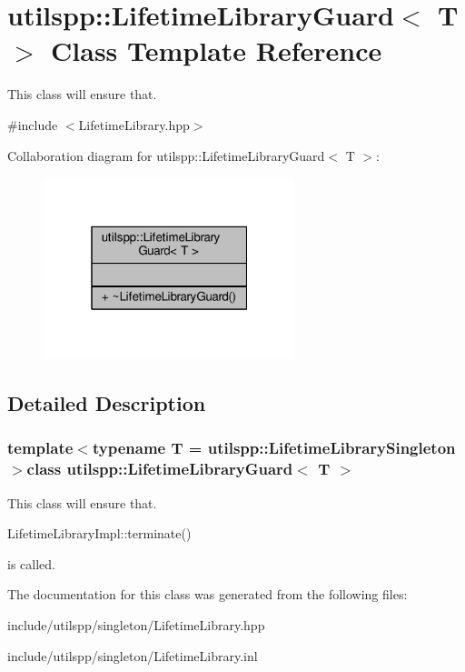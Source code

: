 \hypertarget{classutilspp_1_1LifetimeLibraryGuard}{\section{utilspp\-:\-:Lifetime\-Library\-Guard$<$ T $>$ Class Template Reference}
\label{classutilspp_1_1LifetimeLibraryGuard}
}


This class will ensure that.  




{\ttfamily \#include $<$Lifetime\-Library.\-hpp$>$}



Collaboration diagram for utilspp\-:\-:Lifetime\-Library\-Guard$<$ T $>$\-:\nopagebreak
\begin{figure}[H]
\begin{center}
\leavevmode
\includegraphics[width=208pt]{classutilspp_1_1LifetimeLibraryGuard__coll__graph}
\end{center}
\end{figure}


\subsection{Detailed Description}
\subsubsection*{template$<$typename T = utilspp\-::\-Lifetime\-Library\-Singleton$>$class utilspp\-::\-Lifetime\-Library\-Guard$<$ T $>$}

This class will ensure that. 

Lifetime\-Library\-Impl\-::terminate()

is called. 

The documentation for this class was generated from the following files\-:\begin{DoxyCompactItemize}
\item 
include/utilspp/singleton/Lifetime\-Library.\-hpp\item 
include/utilspp/singleton/Lifetime\-Library.\-inl\end{DoxyCompactItemize}
